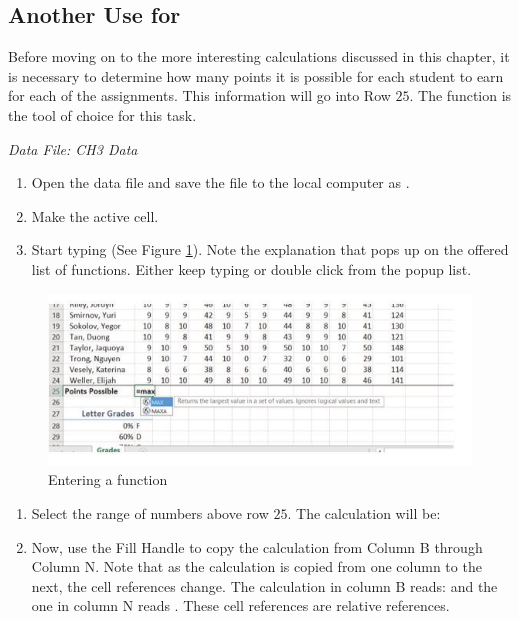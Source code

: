 \subsection{Another Use for }

Before moving on to the more interesting calculations discussed in this chapter, it is necessary to determine how many points it is possible for each student to earn for each of the assignments. This information will go into Row $ 25 $. The  function is the tool of choice for this task.

\textit{Data File: CH3 Data}

\begin{enumerate}
	\item Open the data file  and save the file to the local computer as .
	\item Make  the active cell.
	\item Start typing  (See Figure \ref{03:fig02}). Note the explanation that pops up on the offered list of functions. Either keep typing \fmtTyping{(} or double click  from the popup list.
\end{enumerate}

\begin{figure}[H]
	\centering
	\includegraphics[width=\maxwidth{.95\linewidth}]{gfx/ch03_fig02}
	\caption{Entering a function}
	\label{03:fig02}
\end{figure}

\begin{enumerate}[resume]
	\item Select the range of numbers above row $ 25 $. The calculation will be: 
	\item Now, use the Fill Handle to copy the calculation from Column B through Column N. Note that as the calculation is copied from one column to the next, the cell references change. The calculation in column B reads:  and the one in column N reads . These cell references are relative references.
\end{enumerate}

